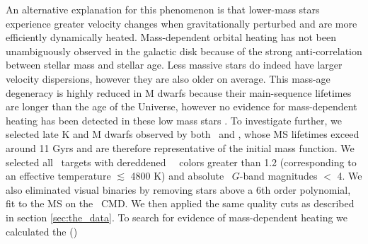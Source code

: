 An alternative explanation for this phenomenon is that lower-mass stars
experience greater velocity changes when gravitationally perturbed and are
more efficiently dynamically heated.
Mass-dependent orbital heating has not been unambiguously observed in the
galactic disk because of the strong anti-correlation between stellar mass and
stellar age.
Less massive stars do indeed have larger velocity dispersions, however they
are also older on average.
This mass-age degeneracy is highly reduced in M dwarfs because their
main-sequence lifetimes are longer than the age of the Universe, however no
evidence for mass-dependent heating has been detected in these low mass stars
\citep{faherty2009}.
To investigate further, we selected late K and M dwarfs observed by both
\kepler\ and \gaia, whose MS lifetimes exceed around 11 Gyrs and are therefore
representative of the initial mass function.
We selected all \kepler\ targets with dereddened \gaia\ \gcolor\ colors
greater than 1.2 (corresponding to an effective temperature $\lesssim$
4800 K) and absolute \gaia\ $G$-band magnitudes $<$ 4.
We also eliminated visual binaries by removing stars above a 6th order
polynomial, fit to the MS on the \gaia\ CMD.
We then applied the same quality cuts as described in section
\ref{sec:the_data}.
To search for evidence of mass-dependent heating we calculated the (\vb)
